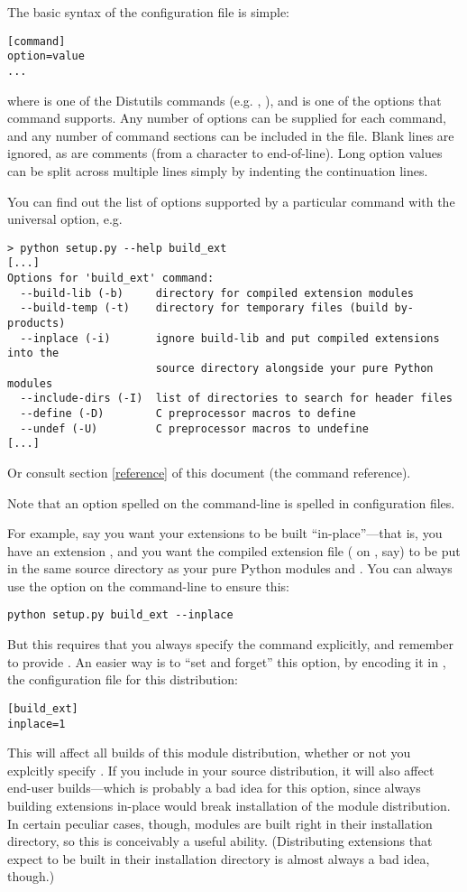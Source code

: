 \documentclass{howto}
\begin{document}
The basic syntax of the configuration file is simple:
\begin{verbatim}
[command]
option=value
...
\end{verbatim}
where  is one of the Distutils commands (e.g.
, ), and  is one of the
options that command supports.  Any number of options can be supplied
for each command, and any number of command sections can be included in
the file.  Blank lines are ignored, as are comments (from a
\character{\#} character to end-of-line).  Long option values can be
split across multiple lines simply by indenting the continuation lines.

You can find out the list of options supported by a particular command
with the universal  option, e.g.
\begin{verbatim}
> python setup.py --help build_ext
[...]
Options for 'build_ext' command:
  --build-lib (-b)     directory for compiled extension modules
  --build-temp (-t)    directory for temporary files (build by-products)
  --inplace (-i)       ignore build-lib and put compiled extensions into the
                       source directory alongside your pure Python modules
  --include-dirs (-I)  list of directories to search for header files
  --define (-D)        C preprocessor macros to define
  --undef (-U)         C preprocessor macros to undefine
[...]
\end{verbatim}
Or consult section \ref{reference} of this document (the command
reference).

Note that an option spelled  on the command-line 
is spelled  in configuration files.

For example, say you want your extensions to be built
``in-place''---that is, you have an extension , and you
want the compiled extension file ( on \UNIX, say) to be put
in the same source directory as your pure Python modules
 and .  You can always use the
 option on the command-line to ensure this:
\begin{verbatim}
python setup.py build_ext --inplace
\end{verbatim}
But this requires that you always specify the 
command explicitly, and remember to provide .
An easier way is to ``set and forget'' this option, by encoding it in
, the configuration file for this distribution:
\begin{verbatim}
[build_ext]
inplace=1
\end{verbatim}
This will affect all builds of this module distribution, whether or not
you explcitly specify .  If you include
 in your source distribution, it will also affect
end-user builds---which is probably a bad idea for this option, since
always building extensions in-place would break installation of the
module distribution.  In certain peculiar cases, though, modules are
built right in their installation directory, so this is conceivably a
useful ability.  (Distributing extensions that expect to be built in
their installation directory is almost always a bad idea, though.)
\end{document}
